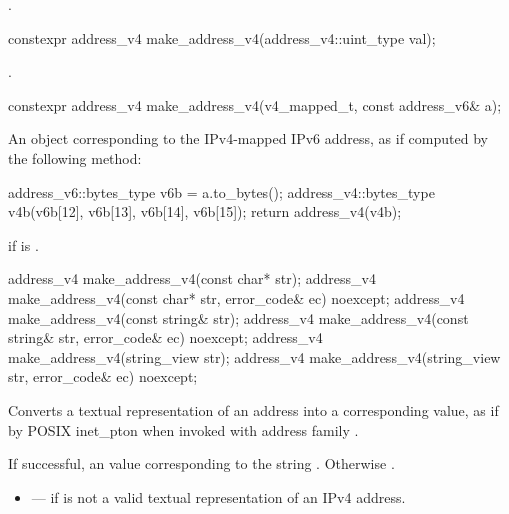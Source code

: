 \begin{itemdescr}
\pnum
\returns {}.
\end{itemdescr}

\begin{itemdecl}
constexpr address_v4 make_address_v4(address_v4::uint_type val);
\end{itemdecl}

\begin{itemdescr}
\pnum
\returns {}.
\end{itemdescr}

\begin{itemdecl}
constexpr address_v4 make_address_v4(v4_mapped_t, const address_v6& a);
\end{itemdecl}

\begin{itemdescr}
\pnum
\returns An  object corresponding to the IPv4-mapped IPv6 address, as if computed by the following method: 
\begin{codeblock}
address_v6::bytes_type v6b = a.to_bytes();
address_v4::bytes_type v4b(v6b[12], v6b[13], v6b[14], v6b[15]);
return address_v4(v4b);
\end{codeblock}


\pnum
\remarks {} if  is .
\end{itemdescr}

\begin{itemdecl}
address_v4 make_address_v4(const char* str);
address_v4 make_address_v4(const char* str, error_code& ec) noexcept;
address_v4 make_address_v4(const string& str);
address_v4 make_address_v4(const string& str, error_code& ec) noexcept;
address_v4 make_address_v4(string_view str);
address_v4 make_address_v4(string_view str, error_code& ec) noexcept;
\end{itemdecl}

\begin{itemdescr}
\pnum
\effects Converts a textual representation of an address into a corresponding  value, as if by POSIX inet_pton when invoked with address family .

\pnum
\returns If successful, an  value corresponding to the string . Otherwise .

\pnum
\errors
\begin{itemize}
\item
{} --- if  is not a valid textual representation of an IPv4 address.
\end{itemize}
\end{itemdescr}



